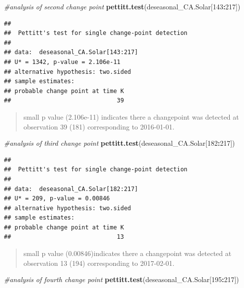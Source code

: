 \documentclass[12pt,]{article}
\newenvironment{Shaded}{\begin{snugshade}}{\end{snugshade}}
\newcommand{\KeywordTok}[1]{\textcolor[rgb]{0.13,0.29,0.53}{\textbf{#1}}}
\newcommand{\DecValTok}[1]{\textcolor[rgb]{0.00,0.00,0.81}{#1}}
\newcommand{\CommentTok}[1]{\textcolor[rgb]{0.56,0.35,0.01}{\textit{#1}}}
\newcommand{\OperatorTok}[1]{\textcolor[rgb]{0.81,0.36,0.00}{\textbf{#1}}}
\newcommand{\NormalTok}[1]{#1}
\begin{document}
\begin{Shaded}
\begin{Highlighting}[]
\CommentTok{#analysis of second change point}
\KeywordTok{pettitt.test}\NormalTok{(deseasonal_CA.Solar[}\DecValTok{143}\OperatorTok{:}\DecValTok{217}\NormalTok{])}
\end{Highlighting}
\end{Shaded}

\begin{verbatim}
## 
##  Pettitt's test for single change-point detection
## 
## data:  deseasonal_CA.Solar[143:217]
## U* = 1342, p-value = 2.106e-11
## alternative hypothesis: two.sided
## sample estimates:
## probable change point at time K 
##                              39
\end{verbatim}

\begin{quote}
small p value (2.106e-11) indicates there a changepoint was detected at
observation 39 (181) corresponding to 2016-01-01.
\end{quote}

\begin{Shaded}
\begin{Highlighting}[]
\CommentTok{#analysis of third change point}
\KeywordTok{pettitt.test}\NormalTok{(deseasonal_CA.Solar[}\DecValTok{182}\OperatorTok{:}\DecValTok{217}\NormalTok{])}
\end{Highlighting}
\end{Shaded}

\begin{verbatim}
## 
##  Pettitt's test for single change-point detection
## 
## data:  deseasonal_CA.Solar[182:217]
## U* = 209, p-value = 0.00846
## alternative hypothesis: two.sided
## sample estimates:
## probable change point at time K 
##                              13
\end{verbatim}

\begin{quote}
small p value (0.00846)indicates there a changepoint was detected at
observation 13 (194) corresponding to 2017-02-01.
\end{quote}

\begin{Shaded}
\begin{Highlighting}[]
\CommentTok{#analysis of fourth change point}
\KeywordTok{pettitt.test}\NormalTok{(deseasonal_CA.Solar[}\DecValTok{195}\OperatorTok{:}\DecValTok{217}\NormalTok{])}
\end{Highlighting}
\end{Shaded}
\end{document}
